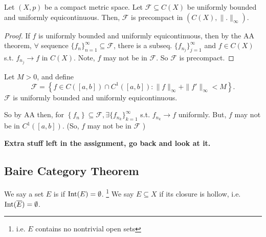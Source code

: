 \begin{cor}
    Let $(X, p)$ be a compact metric space. Let $\mathcal{F} \subseteq C(X)$ be uniformly bounded and
    uniformly equicontinuous. Then, $\mathcal{F}$ is precompact in $(C(X), \| . \|_{\infty} )$.  
\end{cor}
\begin{proof}
    If $f$ is uniformly bounded and uniformly equicontinuous, then by the AA theorem, $\forall$ sequence
    $\{f_{n}\}_{n=1}^{\infty} \subseteq \mathcal{F}$, there is a subseq. $\{f_{n_j}\}_{j=1}^{\infty} $
    and $f \in C(X)$ s.t. $f_{n_j} \to f$ in $C(X)$. Note, $f$ may not be in $\mathcal{F}$. So
    $\mathcal{F}$ is precompact.          
\end{proof}

\begin{exmp}
    Let $M > 0$, and define
    \[
        \mathcal{F} = \left\{ f \in C([a, b]) \cap C^1([a,b]) : \| f \|_{\infty} + \| f' \|_{\infty} < 
        M \right\}.
    \]
    $\mathcal{F}$ is uniformly bounded and uniformly equicontinuous.
    
    So by AA then, for $\left\{ f_n \right\} \subseteq \mathcal{F}, \exists \{f_{n_k}\}_{k=1}^{\infty}$
    s.t. $f_{n_k} \to f$ uniformly. But, $f$ may not be in $C^1([a,b])$. 
    (So, $f$ may not be in $\mathcal{F}$  )
\end{exmp}


\textbf{Extra stuff left in the assignment, go back and look at it.}

\subsection{Baire Category Theorem}

\begin{defn}
    We say a set $E$ is  if $\operatorname{Int}(E) = \emptyset$.
    \footnote{i.e. $E$ contains no nontrivial open sets} 
    We say 
    $E \subseteq X$  if its closure is hollow, i.e.
    $\operatorname{Int}(\overline{E}) = \emptyset$. 
\end{defn}


